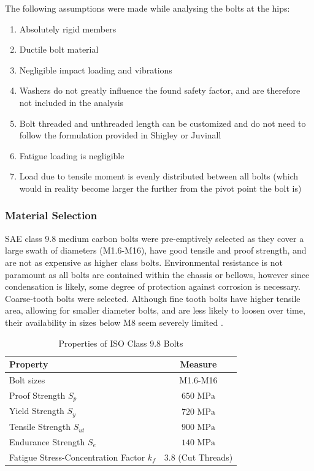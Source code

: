 The following assumptions were made while analysing the bolts at the hips:

\begin{enumerate}
    \item Absolutely rigid members \cite{budynas_shigleys_2015}
    \item Ductile bolt material
    \item Negligible impact loading and vibrations
    \item Washers do not greatly influence the found safety factor, and are therefore not included in the analysis
    \item Bolt threaded and unthreaded length can be customized and do not need to follow the formulation provided in Shigley or Juvinall
    \item Fatigue loading is negligible
    \item Load due to tensile moment is evenly distributed between all bolts (which would in reality become larger the further from the pivot point the bolt is)
\end{enumerate}

\subsubsection{Material Selection}

SAE class 9.8 medium carbon bolts were pre-emptively selected as they cover a large swath of diameters (M1.6-M16), have good tensile and proof strength, and are not as expensive as higher class bolts.
Environmental resistance is not paramount as all bolts are contained within the chassis or bellows, however since condensation is likely, some degree of protection against corrosion is necessary.
Coarse-tooth bolts were selected. Although fine tooth bolts have higher tensile area, allowing for smaller diameter bolts, and are less likely to loosen over time, their availability in sizes below M8 seem severely limited \cite{budynas_shigleys_2015} \cite{nord-lock_group_should_2010}.

\begin{table}[H]
    \centering
    \caption{Properties of ISO Class 9.8 Bolts}
    \label{tab:bolts_material}
    \begin{tabular}{l c}
        \\ \hline
        \textbf{Property} & \textbf{Measure}
        \\ \hline
        Bolt sizes & M1.6-M16
        \\
        Proof Strength $S_p$ & $650\text{ MPa}$
        \\
        Yield Strength $S_y$ & $720\text{ MPa}$
        \\
        Tensile Strength $S_{ut}$ & $900\text{ MPa}$
        \\
        Endurance Strength $S_e$ & $140\text{ MPa}$
        \\
        Fatigue Stress-Concentration Factor $k_f$ & $3.8$ (Cut Threads)
        \\ \hline
    \end{tabular}
\end{table}


